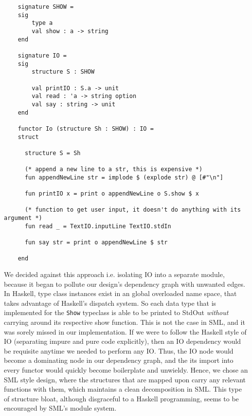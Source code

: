 \documentclass[9pt,letterpaper]{extarticle}
\begin{document}
  \begin{verbatim}
    signature SHOW =
    sig
        type a
        val show : a -> string
    end
    
    signature IO =
    sig
        structure S : SHOW
    
        val printIO : S.a -> unit
        val read : 'a -> string option
        val say : string -> unit
    end
    
    functor Io (structure Sh : SHOW) : IO =
    struct
    
      structure S = Sh
    
      (* append a new line to a str, this is expensive *)
      fun appendNewLine str = implode $ (explode str) @ [#"\n"]
    
      fun printIO x = print o appendNewLine o S.show $ x
    
      (* function to get user input, it doesn't do anything with its argument *)
      fun read _ = TextIO.inputLine TextIO.stdIn
    
      fun say str = print o appendNewLine $ str
    
    end
  \end{verbatim}
  We decided against this approach i.e. isolating IO into a separate module,
  because it began to pollute our design's dependency graph with unwanted edges.
  In Haskell, type class instances exist in an global overloaded name space,
  that takes advantage of Haskell's dispatch system. So each data type that is
  implemented for the \texttt{Show} typeclass is able to be printed to StdOut
  \textit{without} carrying around its respective show function. This is not the
  case in SML, and it was sorely missed in our implementation. If we were to
  follow the Haskell style of IO (separating impure and pure code explicitly),
  then an IO dependency would be requisite anytime we needed to perform any IO.
  Thus, the IO node would become a dominating node in our dependency graph, and
  the its import into every functor would quickly become boilerplate and
  unwieldy. Hence, we chose an SML style design, where the structures that are
  mapped upon carry any relevant functions with them, which maintains a clean
  decomposition in SML. This type of structure bloat, although disgraceful to a
  Haskell programming, seems to be encouraged by SML's module system.
\end{document}
